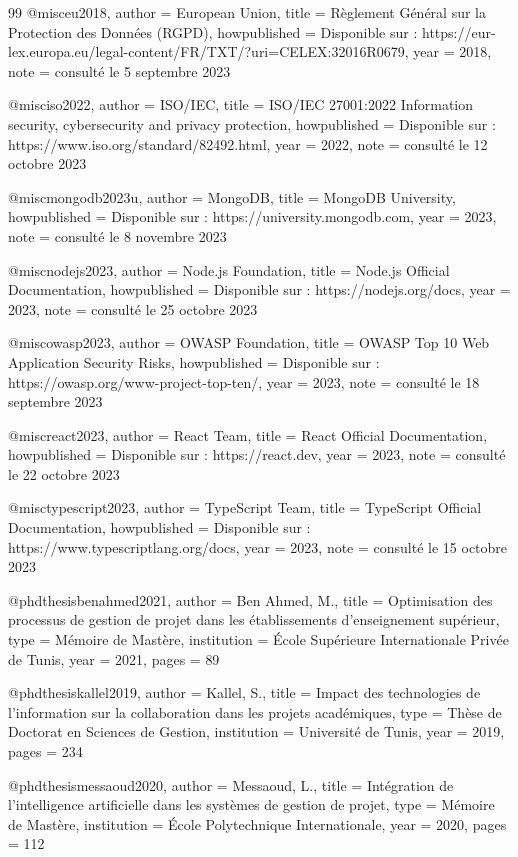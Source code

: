 \begin{thebibliography}{99}
@misc{eu2018,
  author = {European Union},
  title = {Règlement Général sur la Protection des Données (RGPD)},
  howpublished = {Disponible sur : https://eur-lex.europa.eu/legal-content/FR/TXT/?uri=CELEX:32016R0679},
  year = {2018},
  note = {consulté le 5 septembre 2023}
}

@misc{iso2022,
  author = {ISO/IEC},
  title = {ISO/IEC 27001:2022 Information security, cybersecurity and privacy protection},
  howpublished = {Disponible sur : https://www.iso.org/standard/82492.html},
  year = {2022},
  note = {consulté le 12 octobre 2023}
}

@misc{mongodb2023u,
  author = {MongoDB},
  title = {MongoDB University},
  howpublished = {Disponible sur : https://university.mongodb.com},
  year = {2023},
  note = {consulté le 8 novembre 2023}
}

@misc{nodejs2023,
  author = {Node.js Foundation},
  title = {Node.js Official Documentation},
  howpublished = {Disponible sur : https://nodejs.org/docs},
  year = {2023},
  note = {consulté le 25 octobre 2023}
}

@misc{owasp2023,
  author = {OWASP Foundation},
  title = {OWASP Top 10 Web Application Security Risks},
  howpublished = {Disponible sur : https://owasp.org/www-project-top-ten/},
  year = {2023},
  note = {consulté le 18 septembre 2023}
}

@misc{react2023,
  author = {React Team},
  title = {React Official Documentation},
  howpublished = {Disponible sur : https://react.dev},
  year = {2023},
  note = {consulté le 22 octobre 2023}
}

@misc{typescript2023,
  author = {TypeScript Team},
  title = {TypeScript Official Documentation},
  howpublished = {Disponible sur : https://www.typescriptlang.org/docs},
  year = {2023},
  note = {consulté le 15 octobre 2023}
}

@phdthesis{benahmed2021,
  author = {Ben Ahmed, M.},
  title = {Optimisation des processus de gestion de projet dans les établissements d'enseignement supérieur},
  type = {Mémoire de Mastère},
  institution = {École Supérieure Internationale Privée de Tunis},
  year = {2021},
  pages = {89}
}

@phdthesis{kallel2019,
  author = {Kallel, S.},
  title = {Impact des technologies de l'information sur la collaboration dans les projets académiques},
  type = {Thèse de Doctorat en Sciences de Gestion},
  institution = {Université de Tunis},
  year = {2019},
  pages = {234}
}

@phdthesis{messaoud2020,
  author = {Messaoud, L.},
  title = {Intégration de l'intelligence artificielle dans les systèmes de gestion de projet},
  type = {Mémoire de Mastère},
  institution = {École Polytechnique Internationale},
  year = {2020},
  pages = {112}
}


\end{thebibliography}

